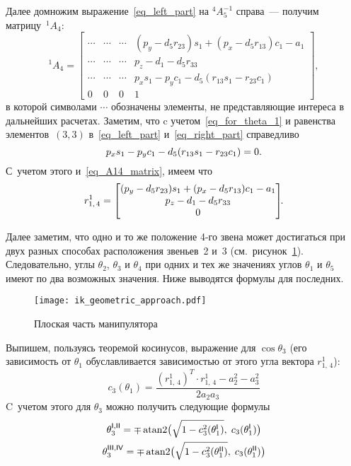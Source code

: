 Далее домножим выражение~\eqref{eq_left_part} на ${}^4A_5^{-1}$ справа~--- получим матрицу~${}^1A_4$:
\begin{equation}\label{eq_A14_matrix}
    {}^1A_4 =
    \begin{bmatrix}
        \cdots & \cdots & \cdots & (p_y - d_5 r_{23})s_1 + (p_x - d_5 r_{13})c_1 - a_1\\
        \cdots & \cdots & \cdots & p_z - d_1 - d_5 r_{33}\\
        \cdots & \cdots & \cdots & p_x s_1 - p_y c_1 - d_5(r_{13} s_1 - r_{23} c_1)\\
        0 & 0 & 0 & 1
    \end{bmatrix}\!\!,
\end{equation}
в которой символами $\cdots$ обозначены элементы, не представляющие интереса в дальнейших расчетах.
Заметим, что c учетом~\eqref{eq_for_theta_1} и равенства элементов~$(3,3)$ в~\eqref{eq_left_part} и~\eqref{eq_right_part} справедливо
\begin{equation}
p_x s_1 - p_y c_1 - d_5(r_{13} s_1 - r_{23} c_1) = 0\ldotp
\end{equation}
С~учетом этого и~\eqref{eq_A14_matrix}, имеем что
\begin{equation}\label{eq_r_1_1_4}
    r^1_{1,\,4} =
    \begin{bmatrix}
        (p_y - d_5 r_{23})s_1 + (p_x - d_5 r_{13})c_1 - a_1 \\
        p_z - d_1 - d_5 r_{33} \\
        0
    \end{bmatrix}\!\!\ldotp
\end{equation}

Далее заметим, что одно и то же положение 4-го звена может достигаться при двух разных способах расположения звеньев~2 и~3 (см.~рисунок~\ref{ik_geometric}).
Следовательно, углы $\theta_2$, $\theta_3$ и $\theta_4$ при одних и тех же значениях углов $\theta_1$ и $\theta_5$ имеют по два возможных значения.
Ниже выводятся формулы для последних.

\begin{figure}[h!]
	\centering
	\texttt{[image: ik\_geometric\_approach.pdf]}
	\caption{Плоская часть манипулятора}
	\label{ik_geometric}
\end{figure}

Выпишем, пользуясь теоремой косинусов, выражение для $\cos\theta_3$ (его зависимость от $\theta_1$ обуславливается зависимостью от этого угла вектора $r^1_{1,\,4}$):
\begin{equation}
	c_3(\theta_1) = \frac{(r^1_{1,\,4})^T \!\! \cdot r^1_{1,\,4}- a_2^2 - a_3^2}{2 a_2 a_3}
\end{equation}
C~учетом этого для $\theta_3$ можно получить следующие формулы
\begin{gather}
	\theta_3^\msf{I,II} = \mp \atan2\bigl(\sqrt{1 - c_3^2(\theta_1^\msf{I})},\; c_3(\theta_1^\msf{I})\bigr)\\
	\theta_3^\msf{III,IV} = \mp \atan2\bigl(\sqrt{1 - c_3^2(\theta_1^\msf{II})},\; c_3(\theta_1^\msf{II})\bigr)
\end{gather}

